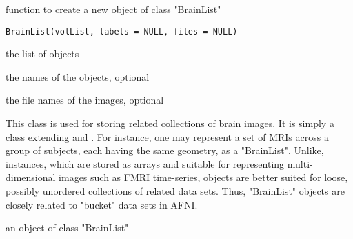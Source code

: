 \begin{Description}\relax
function to create a new object of class "BrainList"
\end{Description}
\begin{Usage}
\begin{verbatim}
BrainList(volList, labels = NULL, files = NULL)
\end{verbatim}
\end{Usage}
\begin{Arguments}
\begin{ldescription}
\item[\code{volList}] the list of  objects 
\item[\code{labels}] the names of the objects, optional 
\item[\code{files}] the file names of the images, optional 
\end{ldescription}
\end{Arguments}
\begin{Details}\relax
This class is used for storing related collections of brain images. It
is simply a class extending  and .
For instance, one may represent a set of MRIs across a group of
subjects, each having the same geometry, as a "BrainList". Unlike,
 instances, which are stored as arrays and
suitable for representing multi-dimensional images such as FMRI
time-series,  objects are better suited for loose,
possibly unordered collections of related data sets. Thus, "BrainList"
objects are closely related to "bucket" data sets in AFNI.
\end{Details}
\begin{Value}
an object of class "BrainList"
\end{Value}

